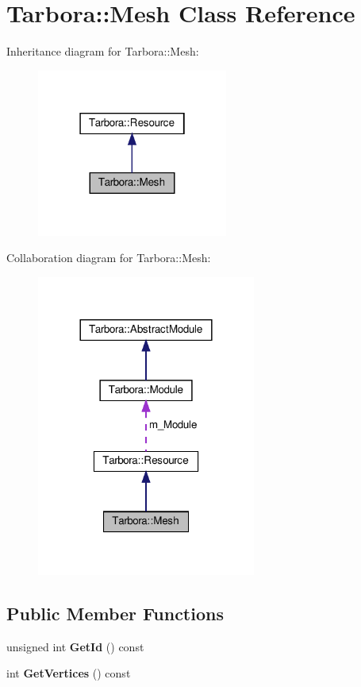 \hypertarget{classTarbora_1_1Mesh}{}\section{Tarbora\+:\+:Mesh Class Reference}
\label{classTarbora_1_1Mesh}


Inheritance diagram for Tarbora\+:\+:Mesh\+:\nopagebreak
\begin{figure}[H]
\begin{center}
\leavevmode
\includegraphics[width=178pt]{classTarbora_1_1Mesh__inherit__graph}
\end{center}
\end{figure}


Collaboration diagram for Tarbora\+:\+:Mesh\+:
\nopagebreak
\begin{figure}[H]
\begin{center}
\leavevmode
\includegraphics[width=204pt]{classTarbora_1_1Mesh__coll__graph}
\end{center}
\end{figure}
\subsection*{Public Member Functions}
\begin{DoxyCompactItemize}
\item 
\mbox{\label{classTarbora_1_1Mesh_ae79b3153ff4ebd7d6336ce118684b542}} 
unsigned int {\bfseries Get\+Id} () const
\item 
\mbox{\label{classTarbora_1_1Mesh_a208eb6a1cb509804f9b6e25b6592bc60}} 
int {\bfseries Get\+Vertices} () const
\end{DoxyCompactItemize}
